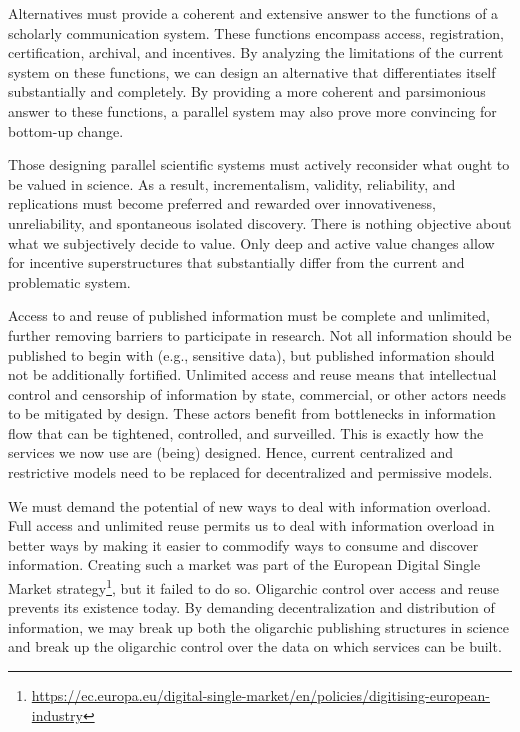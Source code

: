 \documentclass[a5paper]{book}
\let\rmarkdownfootnote\footnote%
\def\footnote{\protect\rmarkdownfootnote}
\begin{document}
Alternatives must provide a coherent and extensive answer to the
functions of a scholarly communication system. These functions encompass
access, registration, certification, archival, and incentives. By
analyzing the limitations of the current system on these functions, we
can design an alternative that differentiates itself substantially and
completely. By providing a more coherent and parsimonious answer to
these functions, a parallel system may also prove more convincing for
bottom-up change.

Those designing parallel scientific systems must actively reconsider
what ought to be valued in science. As a result, incrementalism,
validity, reliability, and replications must become preferred and
rewarded over innovativeness, unreliability, and spontaneous isolated
discovery. There is nothing objective about what we subjectively decide
to value. Only deep and active value changes allow for incentive
superstructures that substantially differ from the current and
problematic system.

Access to and reuse of published information must be complete and
unlimited, further removing barriers to participate in research. Not all
information should be published to begin with (e.g., sensitive data),
but published information should not be additionally fortified.
Unlimited access and reuse means that intellectual control and
censorship of information by state, commercial, or other actors needs to
be mitigated by design. These actors benefit from bottlenecks in
information flow that can be tightened, controlled, and surveilled. This
is exactly how the services we now use are (being) designed. Hence,
current centralized and restrictive models need to be replaced for
decentralized and permissive models.

We must demand the potential of new ways to deal with information
overload. Full access and unlimited reuse permits us to deal with
information overload in better ways by making it easier to commodify
ways to consume and discover information. Creating such a market was
part of the European Digital Single Market strategy\footnote{\url{https://ec.europa.eu/digital-single-market/en/policies/digitising-european-industry}},
but it failed to do so. Oligarchic control over access and reuse
prevents its existence today. By demanding decentralization and
distribution of information, we may break up both the oligarchic
publishing structures in science and break up the oligarchic control
over the data on which services can be built.
\end{document}
